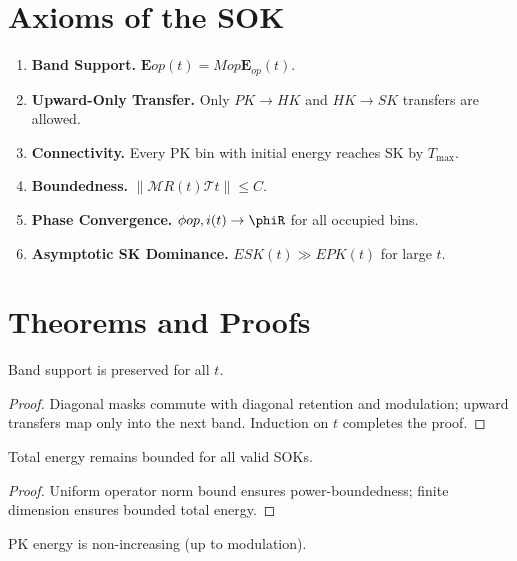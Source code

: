 \documentclass[11pt]{article}
\begin{document}
\section{Axioms of the SOK}

\begin{enumerate}[label=\textbf{A\arabic*.}]
    \item \textbf{Band Support.} 
    $\mathbf{E}{op}(t)=M{op}\mathbf{E}_{op}(t)$.
    \item \textbf{Upward-Only Transfer.} 
    Only $PK\to HK$ and $HK\to SK$ transfers are allowed.
    \item \textbf{Connectivity.} 
    Every PK bin with initial energy reaches SK by $T_{\max}$.
    \item \textbf{Boundedness.} 
    $\|\mathcal{M}R(t)\mathcal{T}t\|\le C$.
    \item \textbf{Phase Convergence.} 
    $\phi{op,i}(t)\to\phiR$ for all occupied bins.
    \item \textbf{Asymptotic SK Dominance.} 
    $E{SK}(t)\gg E{PK}(t)$ for large $t$.
\end{enumerate}

\section{Theorems and Proofs}

\begin{theorem}
Band support is preserved for all $t$.
\end{theorem}

\begin{proof}
Diagonal masks commute with diagonal retention and modulation; upward transfers 
map only into the next band. Induction on $t$ completes the proof.
\end{proof}

\begin{theorem}
Total energy remains bounded for all valid SOKs.
\end{theorem}

\begin{proof}
Uniform operator norm bound ensures power-boundedness; finite dimension ensures 
bounded total energy.
\end{proof}

\begin{theorem}
PK energy is non-increasing (up to modulation).
\end{theorem}
\end{document}
